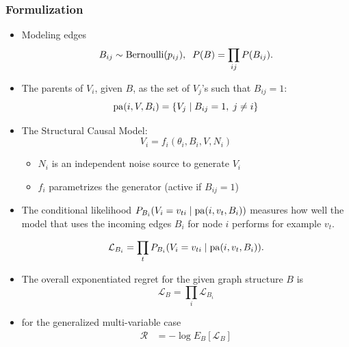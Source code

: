 \documentclass{beamer}
\begin{document}
\begin{frame}
\frametitle{Formulization}
\begin{itemize}
\item Modeling edges
\begin{equation*}
B_{ij} \sim {\rm Bernoulli}(p_{ij}), \nonumber \;\;
P(B) = \prod_{ij} P(B_{ij}).
\end{equation*}

\item
The parents of $V_i$, given $B$, as the set of $V_j$'s such that $B_{ij}=1$:
\begin{equation*}
{\rm pa}(i,V,B_i) = \{ V_j \mid B_{ij}=1, \; j\neq i\}
\end{equation*}
\item
The Structural Causal Model:
\begin{equation*}
V_i = f_i(\theta_i, B_i, V, N_i)
\end{equation*}
\begin{itemize}
\item
$N_i$ is an independent noise source to generate $V_i$ 
\item
$f_i$ parametrizes the generator  (active if $B_{ij}=1$)
\end{itemize}
\end{itemize}
\end{frame}

\begin{frame}
\begin{itemize}
	\item
	The conditional likelihood $P_{B_i}(V_i=v_{ti}\mid {\rm pa}(i,v_t,B_i))$ measures how well
	the model that uses the incoming edges $B_i$ for node $i$ performs for example $v_t$.
	
	\begin{equation}
	\mathcal{L}_{B_i} = \prod_t P_{B_i}(V_i=v_{ti}\mid {\rm pa}(i,v_t,B_i)).
	\end{equation}
	\item
	The overall exponentiated regret for the given graph structure $B$ is
	$$\mathcal{L}_B = \prod_i \mathcal{L}_{B_i}$$
	
	\item
	for the generalized multi-variable case
	\begin{align}
	\label{eq:regret}
	\mathcal{R} &= - \log E_B[ \mathcal{L}_B ]
	\end{align}
\end{itemize}
\end{frame}
\end{document}
